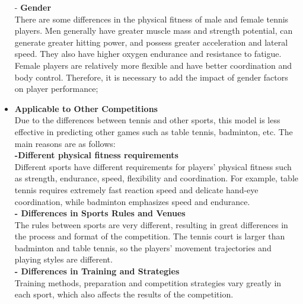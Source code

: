 \begin{itemize}
- \textbf{Gender}\\
   There are some differences in the physical fitness of male and female tennis players. Men generally have greater muscle mass and strength potential, can generate greater hitting power, and possess greater acceleration and lateral speed. They also have higher oxygen endurance and resistance to fatigue. Female players are relatively more flexible and have better coordination and body control. Therefore, it is necessary to add the impact of gender factors on player performance;
    \\
    \item \textbf{Applicable to Other Competitions}\\
    Due to the differences between tennis and other sports, this model is less effective in predicting other games such as table tennis, badminton, etc. The main reasons are as follows:\\
    \textbf{-Different physical fitness requirements}\\
    Different sports have different requirements for players’ physical fitness such as strength, endurance, speed, flexibility and coordination. For example, table tennis requires extremely fast reaction speed and delicate hand-eye coordination, while badminton emphasizes speed and endurance.\\
    \textbf{- Differences in Sports Rules and Venues}
    \\ The rules between sports are very different, resulting in great differences in the process and format of the competition. The tennis court is larger than badminton and table tennis, so the players' movement trajectories and playing styles are different.\\
    \textbf{- Differences in Training and Strategies}\\
    Training methods, preparation and competition strategies vary greatly in each sport, which also affects the results of the competition.
\end{itemize}